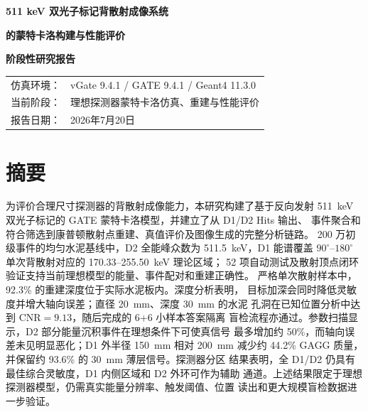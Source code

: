 \documentclass[UTF8,a4paper,zihao=-4,fontset=fandol]{ctexart}
\renewcommand{\arraystretch}{1.22}
\begin{document}
\hypersetup{pageanchor=false}
\begin{titlepage}
  \thispagestyle{empty}
  \centering
  \vspace*{0.17\textheight}
  {\bfseries 511 keV 双光子标记背散射成像系统\par}
  \vspace{0.8em}
  {\bfseries 的蒙特卡洛构建与性能评价\par}
  \vspace{2.2em}
  {\bfseries 阶段性研究报告\par}
  \vfill
  \renewcommand{\arraystretch}{1.45}
  \begin{tabular}{rl}
    仿真环境：& vGate 9.4.1 / GATE 9.4.1 / Geant4 11.3.0 \\
    当前阶段：& 理想探测器蒙特卡洛仿真、重建与性能评价 \\
    报告日期：& 2026年7月20日 \\
  \end{tabular}
  \vspace*{0.10\textheight}
\end{titlepage}

\hypersetup{pageanchor=true}

\section*{摘要}

为评价合理尺寸探测器的背散射成像能力，本研究构建了基于反向发射
511~keV 双光子标记的 GATE 蒙特卡洛模型，并建立了从 D1/D2 Hits 输出、
事件聚合和符合筛选到康普顿散射点重建、真值评价及图像生成的完整分析链路。
200 万初级事件的均匀水泥基线中，D2 全能峰众数为 511.5~keV，D1 能谱覆盖
$90^\circ$--$180^\circ$ 单次背散射对应的 170.33--255.50~keV 理论区域；
52 项自动测试及散射顶点闭环验证支持当前理想模型的能量、事件配对和重建正确性。
严格单次散射样本中，92.3\% 的重建深度位于实际水泥板内。深度分析表明，
目标加深会同时降低灵敏度并增大轴向误差；直径 20~mm、深度 30~mm 的水泥
孔洞在已知位置分析中达到 $\mathrm{CNR}=9.13$，随后完成的 6+6 小样本答案隔离
盲检流程亦通过。参数扫描显示，D2 部分能量沉积事件在理想条件下可使真信号
最多增加约 50\%，而轴向误差未见明显恶化；D1 外半径 150~mm 相对 200~mm
减少约 44.2\% GAGG 质量，并保留约 93.6\% 的 30~mm 薄层信号。探测器分区
结果表明，全 D1/D2 仍具有最佳综合灵敏度，D1 内侧区域和 D2 外环可作为辅助
通道。上述结果限定于理想探测器模型，仍需真实能量分辨率、触发阈值、位置
读出和更大规模盲检数据进一步验证。
\end{document}

